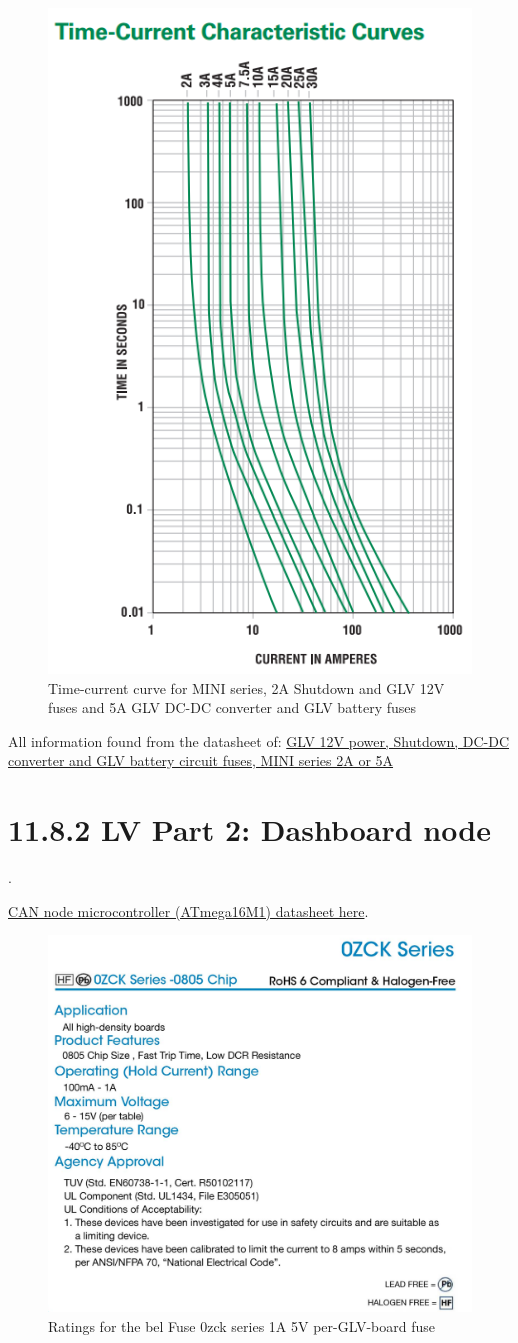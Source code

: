\documentclass{article}
\begin{document}
{\begin{figure}[H]
    \centering
    \includegraphics[width = 0.6 \textwidth]{shutdownfusecurve}
    \caption{Time-current curve for MINI series, 2A Shutdown and GLV 12V fuses and 5A GLV DC-DC converter and GLV battery fuses}
    \label{shutdownfusecurve}
\end{figure}

All information found from the datasheet of:
\href{http://www.littelfuse.com/~/media/automotive/datasheets/fuses/automotive-fuses/littelfuse_automotive_blade_fuse_mini_32v.pdf}{GLV 12V power, Shutdown, DC-DC converter and GLV battery circuit fuses, MINI series 2A or 5A}

\section*{11.8.2 LV Part 2: Dashboard node}.

\href{http://www.atmel.com/images/8209s.pdf}{CAN node microcontroller (ATmega16M1) datasheet here}.

\begin{figure}[H]
    \centering
    \includegraphics[width = 0.7 \textwidth]{1AGLVlowratings}
    \caption{Ratings for the bel Fuse 0zck series 1A 5V per-GLV-board fuse}
    \label{5V1Afuserating}
\end{figure}

}
\end{document}
